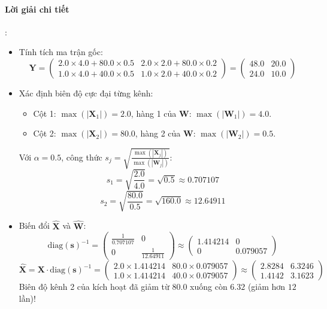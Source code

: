 \paragraph{Lời giải chi tiết}:
\begin{itemize}
  \item[1)] Tính tích ma trận gốc:
  \begin{equation*}
  \mathbf{Y} = \begin{pmatrix} 2.0 \times 4.0 + 80.0 \times 0.5 & 2.0 \times 2.0 + 80.0 \times 0.2 \\ 1.0 \times 4.0 + 40.0 \times 0.5 & 1.0 \times 2.0 + 40.0 \times 0.2 \end{pmatrix} = \begin{pmatrix} 48.0 & 20.0 \\ 24.0 & 10.0 \end{pmatrix}
  \end{equation*}

  \item[2)] Xác định biên độ cực đại từng kênh:
  \begin{itemize}
    \item Cột 1: $\max(|\mathbf{X}_1|) = 2.0$, hàng 1 của $\mathbf{W}$: $\max(|\mathbf{W}_1|) = 4.0$.
    \item Cột 2: $\max(|\mathbf{X}_2|) = 80.0$, hàng 2 của $\mathbf{W}$: $\max(|\mathbf{W}_2|) = 0.5$.
  \end{itemize}
  Với $\alpha = 0.5$, công thức $s_j = \sqrt{\frac{\max(|\mathbf{X}_j|)}{\max(|\mathbf{W}_j|)}}$:
  \begin{equation*}
  s_1 = \sqrt{\frac{2.0}{4.0}} = \sqrt{0.5} \approx 0.707107
  \end{equation*}
  \begin{equation*}
  s_2 = \sqrt{\frac{80.0}{0.5}} = \sqrt{160.0} \approx 12.64911
  \end{equation*}

  \item[3)] Biến đổi $\hat{\mathbf{X}}$ và $\hat{\mathbf{W}}$:
  \begin{equation*}
  \text{diag}(\mathbf{s})^{-1} = \begin{pmatrix} \frac{1}{0.707107} & 0 \\ 0 & \frac{1}{12.64911} \end{pmatrix} \approx \begin{pmatrix} 1.414214 & 0 \\ 0 & 0.079057 \end{pmatrix}
  \end{equation*}
  \begin{equation*}
  \hat{\mathbf{X}} = \mathbf{X} \cdot \text{diag}(\mathbf{s})^{-1} = \begin{pmatrix} 2.0 \times 1.414214 & 80.0 \times 0.079057 \\ 1.0 \times 1.414214 & 40.0 \times 0.079057 \end{pmatrix} \approx \begin{pmatrix} 2.8284 & 6.3246 \\ 1.4142 & 3.1623 \end{pmatrix}
  \end{equation*}
  Biên độ kênh 2 của kích hoạt đã giảm từ $80.0$ xuống còn $6.32$ (giảm hơn $12$ lần)!
  

\end{itemize}
